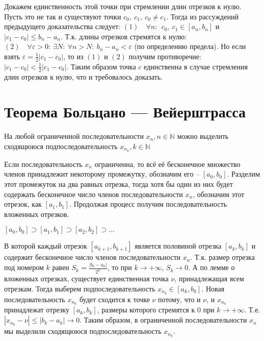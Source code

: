 Докажем единственность этой точки при стремлении длин отрезков к нулю.\newline
Пусть это не так и существуют точки $c_0,\ c_1,\ c_0 \neq c_1$. Тогда из рассуждений предыдущего доказательства следует:\newline
$(1) \quad \forall n:\ \ c_0,\ c_1 \in [a_n, b_n]$ и $|c_1 - c_0| \leq b_n - a_n$.
Т.к. длины отрезков стремятся к нулю:\newline
$(2) \quad \forall \varepsilon > 0:\ \exists N:\ \forall n > N:\ b_n - a_n < \varepsilon$ (по определению предела).\newline
Но если взять $\varepsilon = \frac{1}{2} |c_1 - c_0|$, то из $(1)$ и $(2)$ получим противоречие: $|c_1 - c_0| < \frac{1}{2} |c_1 - c_0|$.\newline
Таким образом точка $c$ единственна в случае стремления длин отрезков к нулю, что и требовалось доказать.

\section[Т. Больцано]{Теорема Больцано — Вейерштрасса}
\begin{theorem}
На любой ограниченной последовательности $x_n, n \in \mathbb{N}$ можно выделить сходящююся подпоследовательность $x_{n_k}, k \in \mathbb{N}$
\end{theorem}
Если последовательность $x_n$ ограниченна, то всё её бесконечное множество членов принадлежит некоторому промежутку, обозначим его -- $[a_0, b_0]$. Разделим этот промежуток на два равных отрезка, тогда хотя бы один из них будет содержать бесконечное число членов последовательности $x_n$, обозначим этот отрезок, как $[a_1, b_1]$. Продолжая процесс получим последовательность вложенных отрезков.
\begin{center}$[a_0, b_0] \supset [a_1, b_1] \supset [a_2, b_2] \supset \ldots$\end{center}
В которой каждый отрезок $[a_{k+1}, b_{k+1}]$ является половиной отрезка $[a_{k}, b_{k}]$ и содержит бесконечное число членов последовательности $x_n$. Т.к. размер отрезка под номером $k$ равен $S_k=\frac{|b_0-a_0|}{2^k}$, то при $k \to +\infty$, $S_k \to 0$. А по лемме о вложенных отрезках, существует единственная точка $\nu$, принадлежащая всем отрезкам. Тогда выберем подпоследовательность $x_{n_k} \in [a_k, b_k]$. Новая последовательность $x_{n_k}$ будет сходится к точке $\nu$ потому, что и $\nu$, и $x_{n_k}$ принадлежат отрезку $[a_k, b_k]$, размеры которого стремятся к $0$ при $k \to +\infty$. Т.е. $|x_{n_k}-\nu| \leq |b_k - a_k| \to 0$. Таким образом, в ограниченной последовательности $x_n$ мы выделили сходящююся подпоследовательность $x_{n_k}$.  
